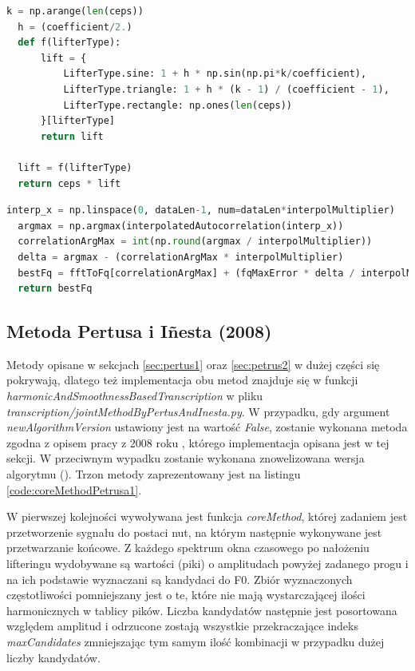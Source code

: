 \documentclass[12pt,a4paper,twoside]{mwart}
\begin{document}
\begin{lstlisting}[float, language=Python, caption={Filtrowanie w domenie quefrency}, captionpos=b, label={code:liftering}]
  k = np.arange(len(ceps))
  h = (coefficient/2.)
  def f(lifterType):
      lift = {
          LifterType.sine: 1 + h * np.sin(np.pi*k/coefficient),
          LifterType.triangle: 1 + h * (k - 1) / (coefficient - 1),
          LifterType.rectangle: np.ones(len(ceps))
      }[lifterType]
      return lift

  lift = f(lifterType)
  return ceps * lift
\end{lstlisting}

\begin{lstlisting}[float, language=Python, caption={Wyznaczanie F0 w ACLOS}, captionpos=b, label={code:bestFqInterpolate}]
  interp_x = np.linspace(0, dataLen-1, num=dataLen*interpolMultiplier)
  argmax = np.argmax(interpolatedAutocorrelation(interp_x))
  correlationArgMax = int(np.round(argmax / interpolMultiplier))
  delta = argmax - (correlationArgMax * interpolMultiplier)
  bestFq = fftToFq[correlationArgMax] + (fqMaxError * delta / interpolMultiplier)
  return bestFq
\end{lstlisting}


\subsection{Metoda Pertusa i Iñesta (2008)}\label{sec:impl:alg:specSmoothnes}
Metody opisane w sekcjach \ref{sec:pertus1} oraz \ref{sec:petrus2} w dużej części się pokrywają, dlatego też implementacja obu metod znajduje się w funkcji \textit{harmonicAndSmoothnessBasedTranscription} w pliku \textit{transcription/jointMethodByPertusAndInesta.py}. W przypadku, gdy argument \textit{newAlgorithmVersion} ustawiony jest na wartość \textit{False}, zostanie wykonana metoda zgodna z opisem pracy z 2008 roku \cite{Transcription:Pertus:Inharmonicity}, którego implementacja opisana jest w tej sekcji. W przeciwnym wypadku zostanie wykonana znowelizowana wersja algorytmu (\cite{Transcription:Pertus:Inharmonicity2}). Trzon metody zaprezentowany jest na listingu \ref{code:coreMethodPetrusa1}.

W pierwszej kolejności wywoływana jest funkcja \textit{coreMethod}, której zadaniem jest przetworzenie sygnału do postaci nut, na którym następnie wykonywane jest przetwarzanie końcowe. Z każdego spektrum okna czasowego po nałożeniu lifteringu wydobywane są wartości (piki) o amplitudach powyżej zadanego progu i na ich podstawie wyznaczani są kandydaci do F0. Zbiór wyznaczonych częstotliwości pomniejszany jest o te, które nie mają wystarczającej ilości harmonicznych w tablicy pików. Liczba kandydatów następnie jest posortowana względem amplitud i odrzucone zostają wszystkie przekraczające indeks \textit{maxCandidates} zmniejszając tym samym ilość kombinacji w przypadku dużej liczby kandydatów.
\end{document}
